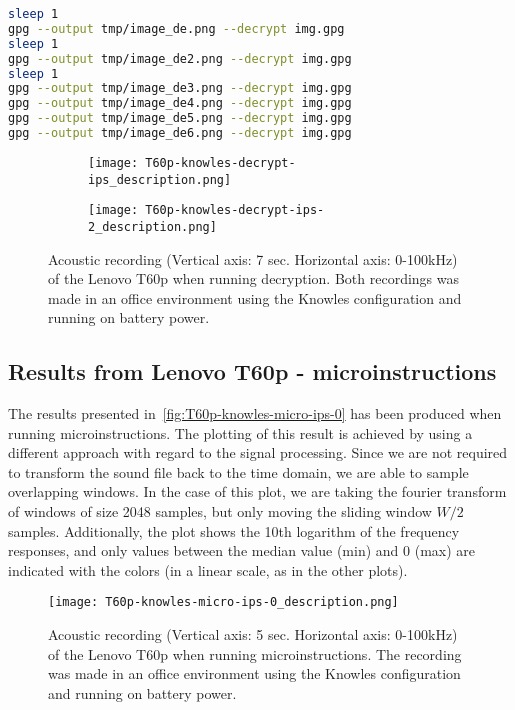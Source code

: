 \begin{lstlisting}[language=BASH, caption={Decryption of an image file.}, 
label={lst:decryption_loop}]
sleep 1             
gpg --output tmp/image_de.png --decrypt img.gpg
sleep 1
gpg --output tmp/image_de2.png --decrypt img.gpg
sleep 1
gpg --output tmp/image_de3.png --decrypt img.gpg
gpg --output tmp/image_de4.png --decrypt img.gpg    
gpg --output tmp/image_de5.png --decrypt img.gpg
gpg --output tmp/image_de6.png --decrypt img.gpg
\end{lstlisting}

\begin{figure}[ht]
    \begin{subfigure}{0.5\textwidth}
        \centering
        \texttt{[image: T60p-knowles-decrypt-ips\_description.png]}
        \caption{}
        \label{fig:T60p-knowles-decrypt-ips}
    \end{subfigure}
    \begin{subfigure}{0.5\textwidth}
        \centering
        \texttt{[image: T60p-knowles-decrypt-ips-2\_description.png]}
        \caption{}
        \label{fig:T60p-knowles-decrypt-ips-2}
    \end{subfigure}
    \caption{Acoustic recording (Vertical axis: 7 sec. Horizontal axis: 0-100kHz) of the Lenovo T60p when running decryption.
    Both recordings was made in an office environment using the Knowles configuration and running on battery power. }
    \label{fig:T60p-knowles-decrypt-ips}
\end{figure}

\subsection{Results from Lenovo T60p - microinstructions}\label{chp5:subsec:t60p_knowles_results_micro}
The results presented in~\autoref{fig:T60p-knowles-micro-ips-0} has been produced when running microinstructions.
The plotting of this result is achieved by using a different approach with regard to the signal processing. 
Since we are not required to transform the sound file back to the time domain, we are able to sample overlapping windows.
In the case of this plot, we are taking the fourier transform of windows of size 2048 samples, but only moving the sliding window \({W/2}\) samples.
Additionally, the plot shows the 10th logarithm of the frequency responses, and only values between the median value (min) and 0 (max) are indicated with the colors (in a linear scale, as in the other plots). 
\begin{figure}[ht]
    \centering
    \texttt{[image: T60p-knowles-micro-ips-0\_description.png]}
    \caption{Acoustic recording (Vertical axis: 5 sec. Horizontal axis: 0-100kHz) of the Lenovo T60p when running microinstructions. The recording was made in an office environment using the Knowles configuration and running on battery power. }
    \label{fig:T60p-knowles-micro-ips-0}
\end{figure}
